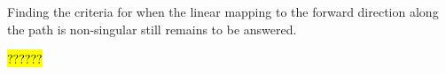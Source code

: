 Finding the criteria for when the linear mapping to the forward direction along the path is non-singular still remains to be answered.

\hl{??????}



